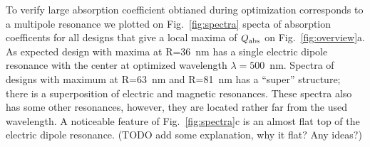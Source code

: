 \documentclass[aps,prl,twocolumn,showpacs,superscriptaddress,groupedaddress]{revtex4-1}
\begin{document}
\begin{figure}
\end{figure}
To verify large absorption coefficient obtianed during optimization
corresponds to a multipole resonance we plotted on
Fig.~\ref{fig:spectra} specta of absorption coefficents for all
designs that give a local maxima of $Q_{\rm abs}$ on
Fig.~\ref{fig:overview}a.  As expected design with maxima at R=36~nm
has a single electric dipole resonance with the center at optimized
wavelength $\lambda=500$~nm.  Spectra of designs with maximum at
R=63~nm and R=81~nm has a ``super'' structure; there is a
superposition of electric and magnetic resonances.  These spectra also
has some other resonances, however, they are located rather far from
the used wavelength.  A noticeable feature of Fig.~\ref{fig:spectra}c is
an almost flat top of the electric dipole resonance. (TODO add some
explanation, why it flat? Any ideas?)
\end{document}
